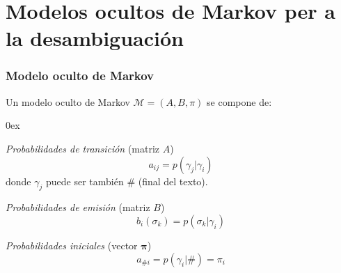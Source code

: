 \documentclass{beamer}
\begin{document}
\section{Modelos ocultos de Markov per a la desambiguación}
\begin{frame}
\frametitle{ Modelo oculto de Markov}

{
{Un modelo oculto de Markov \(\mathcal{M}=(A,B,\pi)\) se compone de:}

\begin{itemize}\itemsep 0ex
{\item \emph{Probabilidades de transición} (matriz \(A\))
\[a_{ij}=p(\gamma_j|\gamma_i)\]
donde $\gamma_j$ puede ser también \(\#\) (final del texto).}

{\item \emph{Probabilidades de emisión} (matriz \(B\))
\[b_{i}(\sigma_k)=p(\sigma_k|\gamma_i)\]}

{\item \emph{Probabilidades iniciales} (vector \(\mathbf{\pi}\))
\[a_{\#i}=p(\gamma_i|\#)=\pi_i\]
}
\end{itemize}
}
\end{frame}
\end{document}
